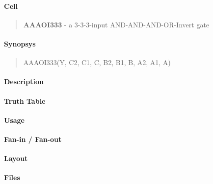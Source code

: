 \label{AAAOI333}
\paragraph{Cell}
\begin{quote}
    \textbf{AAAOI333} - a 3-3-3-input AND-AND-AND-OR-Invert gate
\end{quote}

\paragraph{Synopsys}
\begin{quote}
    AAAOI333(Y, C2, C1, C, B2, B1, B, A2, A1, A)
\end{quote}

\paragraph{Description}



\paragraph{Truth Table}


\paragraph{Usage}

\paragraph{Fan-in / Fan-out}

\paragraph{Layout}

\paragraph{Files}
